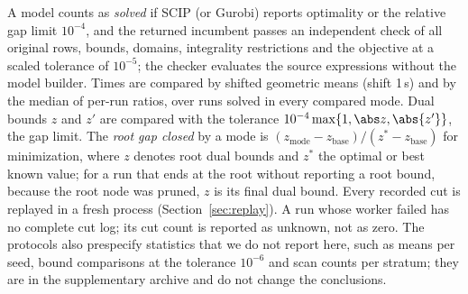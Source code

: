A model counts as \emph{solved} if SCIP (or Gurobi) reports optimality or the
relative gap limit $10^{-4}$, and the returned incumbent passes an independent
check of all original rows, bounds, domains, integrality restrictions and the
objective at a scaled tolerance of $10^{-5}$; the checker evaluates the source
expressions without the model builder. Times are compared by shifted geometric
means (shift 1\,s) and by the median of per-run ratios, over runs solved in
every compared mode. Dual bounds $z$ and $z'$ are compared with the tolerance
$10^{-4}\max\{1,\abs z,\abs{z'}\}$, the gap limit. The \emph{root gap closed} by
a mode is $(z_{\text{mode}}-z_{\text{base}})/(z^\ast-z_{\text{base}})$ for
minimization, where $z$ denotes root dual bounds and $z^\ast$ the optimal or
best known value; for a run that ends at the root without reporting a root
bound, because the root node was pruned, $z$ is its final dual bound. Every
recorded cut is replayed in a fresh process (Section~\ref{sec:replay}). A run
whose worker failed has no complete cut log; its cut count is reported as
unknown, not as zero. The protocols also prespecify statistics that we do not
report here, such as means per seed, bound comparisons at the tolerance
$10^{-6}$ and scan counts per stratum; they are in the supplementary archive and
do not change the conclusions.

